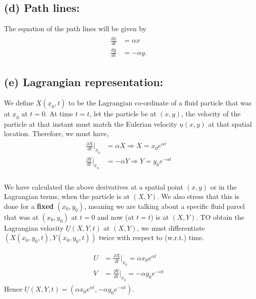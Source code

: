 \documentclass{article}
\begin{document}
\subsection*{(d) Path lines:}
The equation of the path lines will be given by
\begin{align}\label{eq:pathlines}
 \begin{split}
  \frac{dx}{dt} &= \alpha x \\
  \frac{dy}{dt} &= -\alpha y.
 \end{split}
\end{align}
\subsection*{(e) Lagrangian representation:}
We define $\underline{X}(\underline{x}_{0}, t)$ to be the Lagrangian co-ordinate of a fluid particle that was at $\underline{x}_{0}$ at $t = 0$. At time $t=t$, let the particle be at $(x,y)$, the velocity of the particle at that instant must match the Eulerian velocity $\underline{u}(x, y)$ at that spatial location. Therefore, we must have,
\begin{align}\label{eq:lagrangian_coord}
 \begin{split}
  \frac{\partial X}{dt}\bigg|_{\underline{x}_{0}} &= \alpha X \Rightarrow X = x_{0} e^{\alpha t} \\
  \frac{\partial Y}{dt}\bigg|_{\underline{x}_{0}} &= -\alpha Y \Rightarrow Y = y_{0} e^{-\alpha t} \\
  \end{split}
\end{align}

We have calculated the above derivatives at a spatial point $(x, y)$ or in the Lagrangian terms, when the particle is at $(X, Y)$. We also stress that this is done for a \textbf{fixed} $(x_{0}, y_{0})$, meaning we are talking about a specific fluid parcel that was at $(x_{0}, y_{0})$ at $t=0$ and now (at $t=t$) is at $(X, Y)$. 
TO obtain the Lagrangian velocity $\underline{U}(X, Y, t)$ at $(X, Y)$, we must differentiate $(X(x_{0}, y_{0}, t),Y(x_{0}, y_{0}, t))$ twice with respect to (w.r.t.) time. 

\begin{align}\label{eq:lagrangian_velo}
 \begin{split}
  U & = \frac{\partial X}{dt}\bigg|_{\underline{x}_{0}} = \alpha x_{0} e^{\alpha t} \\
  V &= \frac{\partial Y}{dt}\bigg|_{\underline{x}_{0}} = -\alpha y_{0} e^{-\alpha t}
 \end{split}
\end{align}
Hence $\boxed{\underline{U}(X, Y, t) = (\alpha x_{0} e^{\alpha t}, -\alpha y_{0} e^{-\alpha t})}$.
\end{document}
